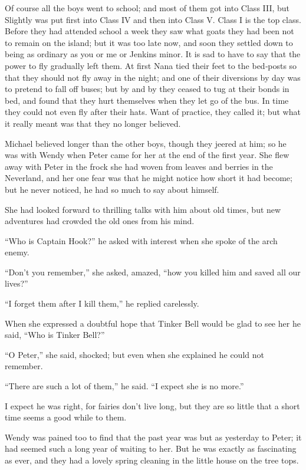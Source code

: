 Of course all the boys went to school;
and most of them got into Class III,
but Slightly was put first into Class IV and then into Class V\@.
Class I is the top class.
Before they had attended school a week they saw what goats they had been not to remain on the island;
but it was too late now, and soon they settled down to being as ordinary as you or me or Jenkins minor.
It is sad to have to say that the power to fly gradually left them.
At first Nana tied their feet to the bed‐posts so that they should not fly away in the night;
and one of their diversions by day was to pretend to fall off buses;
but by and by they ceased to tug at their bonds in bed,
and found that they hurt themselves when they let go of the bus.
In time they could not even fly after their hats.
Want of practice, they called it;
but what it really meant was that they no longer believed.

Michael believed longer than the other boys, though they jeered at him;
so he was with Wendy when Peter came for her at the end of the first year.
She flew away with Peter in the frock she had woven from leaves and berries in the Neverland,
and her one fear was that he might notice how short it had become;
but he never noticed, he had so much to say about himself.

She had looked forward to thrilling talks with him about old times,
but new adventures had crowded the old ones from his mind.

“Who is Captain Hook?\@” he asked with interest when she spoke of the arch enemy.

“Don’t you remember,” she asked, amazed, “how you killed him and saved all our lives?”

“I forget them after I kill them,” he replied carelessly.

When she expressed a doubtful hope that Tinker Bell would be glad to see her
he said, “Who is Tinker Bell?”

“O Peter,” she said, shocked;
but even when she explained he could not remember.

“There are such a lot of them,” he said.
“I expect she is no more.”

I expect he was right, for fairies don’t live long,
but they are so little that a short time seems a good while to them.

Wendy was pained too to find that the past year was but as yesterday to Peter;
it had seemed such a long year of waiting to her.
But he was exactly as fascinating as ever,
and they had a lovely spring cleaning in the little house on the tree tops.

